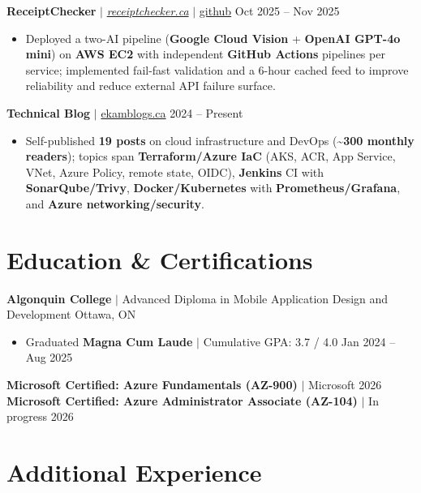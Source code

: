 \documentclass[11pt,a4paper]{article}
\begin{document}
\vspace{4pt}

\textbf{ReceiptChecker} $|$ \href{https://receiptchecker.ca/}{\emph{receiptchecker.ca}} $|$ \href{https://github.com/bhat0155/receipt-check}{\small github} \hfill Oct 2025 -- Nov 2025
\begin{itemize}
    \item Deployed a two-AI pipeline (\textbf{Google Cloud Vision} + \textbf{OpenAI GPT-4o mini}) on \textbf{AWS EC2} with independent \textbf{GitHub Actions} pipelines per service; implemented fail-fast validation and a 6-hour cached feed to improve reliability and reduce external API failure surface.
\end{itemize}

\vspace{4pt}

\textbf{Technical Blog} $|$ \href{https://www.ekamblogs.ca}{ekamblogs.ca} \hfill 2024 -- Present
\begin{itemize}
    \item Self-published \textbf{19 posts} on cloud infrastructure and DevOps (\textasciitilde\textbf{300 monthly readers}); topics span \textbf{Terraform/Azure IaC} (AKS, ACR, App Service, VNet, Azure Policy, remote state, OIDC), \textbf{Jenkins} CI with \textbf{SonarQube/Trivy}, \textbf{Docker/Kubernetes} with \textbf{Prometheus/Grafana}, and \textbf{Azure networking/security}.
\end{itemize}

\section{Education \& Certifications}

\textbf{Algonquin College} $|$ Advanced Diploma in Mobile Application Design and Development \hfill Ottawa, ON
\begin{itemize}
    \item Graduated \textbf{Magna Cum Laude} $|$ Cumulative GPA: 3.7 / 4.0 \hfill Jan 2024 -- Aug 2025
\end{itemize}
\textbf{Microsoft Certified: Azure Fundamentals (AZ-900)} $|$ Microsoft \hfill 2026 \\
\textbf{Microsoft Certified: Azure Administrator Associate (AZ-104)} $|$ In progress \hfill 2026

\section{Additional Experience}
\end{document}
